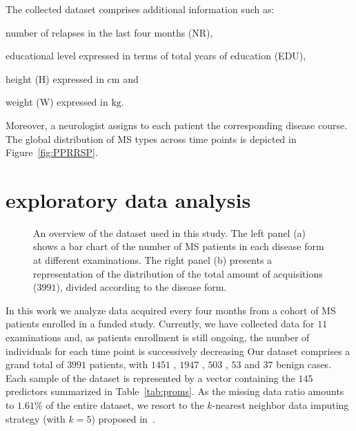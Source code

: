 The collected \PCO dataset comprises additional information such as:
\begin{enumerate*}[label=\roman*)]
	\item number of relapses in the last four months (NR),
	\item educational level expressed in terms of total years of education (EDU),
	\item height (H) expressed in $\text{cm}$ and
	\item weight (W) expressed in $\text{kg}$.
\end{enumerate*}
Moreover, a neurologist assigns to each patient the corresponding disease course. The global distribution of MS types across time points is depicted in Figure~\ref{fig:PPRRSP}.


\section{\PCOs exploratory data analysis} \label{sec:aism_eda}


 \begin{figure}[]
	\centering
	\caption{An overview of the \PCO dataset used in this study. The left panel (a) shows a bar chart of the number of MS patients in each disease form  at different examinations. The right panel (b) presents a representation of the distribution of the total amount of acquisitions ($3991$), divided according to the disease form.}\label{fig:data}
\end{figure}



In this work we analyze \PCOs data acquired every four months from a cohort of MS patients enrolled in a funded study.
Currently, we have collected data for $11$ examinations and, as patients enrollment is still ongoing,  the number of individuals for each time point is successively decreasing
Our dataset comprises a grand total of $3991$ patients, with $1451$ \RR, $1947$ \SP, $503$ \PP, $53$ \PR and $37$ benign cases.
Each sample of the dataset is represented by a vector containing the $145$ predictors summarized in Table~\ref{tab:proms}.
As the missing data ratio amounts to $1.61\%$ of the entire dataset, we resort to the $k$-nearest neighbor data imputing strategy (with $k=5$) proposed in~\cite{troyanskaya2001missing}.

